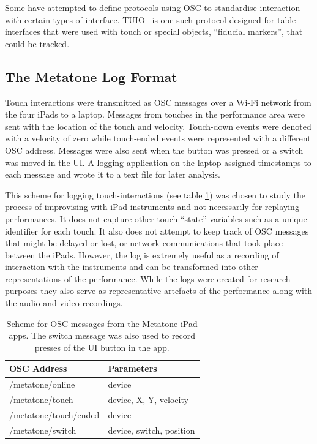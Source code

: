 \documentclass[graybox]{svmult}
\begin{document}
Some have attempted to define protocols using OSC to standardise
interaction with certain types of interface. TUIO~\cite{TUIO_KBBC05}
is one such protocol designed for table interfaces that were used with
touch or special objects, ``fiducial markers'', that could be tracked. 



\subsection{The Metatone Log Format}


Touch interactions were transmitted as OSC messages over a Wi-Fi
network from the four iPads to a laptop. Messages from touches in the
performance area were sent with the location of the touch and
velocity. Touch-down events were denoted with a velocity of zero while
touch-ended events were represented with a different OSC address.
Messages were also sent when the button was pressed or a switch was
moved in the UI. A logging application on the laptop assigned
timestamps to each message and wrote it to a text file for later
analysis.

This scheme for logging touch-interactions (see table \ref{oscschema})
was chosen to study the process of improvising with iPad instruments
and not necessarily for replaying performances. It does not capture
other touch ``state'' variables such as a unique identifier for each
touch. It also does not attempt to keep track of OSC messages that
might be delayed or lost, or network communications that took place
between the iPads. However, the log is extremely useful as a recording
of interaction with the instruments and can be transformed into other
representations of the performance. While the logs were created for
research purposes they also serve as representative artefacts of the
performance along with the audio and video recordings.

\begin{table}
  \begin{tabular}{|l|l|}
  \hline
  OSC Address           & Parameters \\ \hline
  /metatone/online      & device  \\     
  /metatone/touch       & device, X, Y, velocity \\
  /metatone/touch/ended & device \\  
  /metatone/switch      & device, switch, position\\ \hline
  \end{tabular}
  \caption{Scheme for OSC messages from the Metatone iPad apps. The
    switch message was also used to record presses of the UI button in
    the app.}
  \label{oscschema} 
\end{table}
\end{document}
